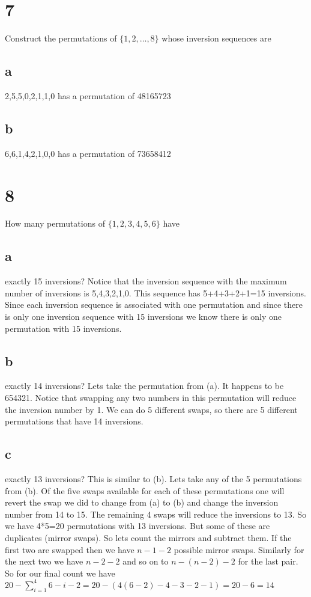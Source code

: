 \documentclass{article}
\begin{document}
\section*{7}
Construct the permutations of $\{1,2,\dots,8\}$ whose inversion sequences are
\subsection*{a}
2,5,5,0,2,1,1,0 has a permutation of 48165723
\subsection*{b}
6,6,1,4,2,1,0,0 has a permutation of 73658412
\section*{8}
How many permutations of $\{1,2,3,4,5,6\}$ have
\subsection*{a}
exactly 15 inversions? Notice that the inversion sequence with the maximum number of inversions is 5,4,3,2,1,0. This sequence has 5+4+3+2+1=15 inversions. Since each inversion sequence is associated with one permutation and since there is only one inversion sequence with 15 inversions we know there is only one permutation with 15 inversions.
\subsection*{b}
exactly 14 inversions? Lets take the permutation from (a). It happens to be 654321. Notice that swapping any two numbers in this permutation will reduce the inversion number by 1. We can do 5 different swaps, so there are 5 different permutations that have 14 inversions.
\subsection*{c}
exactly 13 inversions? This is similar to (b). Lets take any of the 5 permutations from (b). Of the five swaps available for each of these permutations one will revert the swap we did to change from (a) to (b) and change the inversion number from 14 to 15. The remaining 4 swaps will reduce the inversions to 13. So we have 4*5=20 permutations with 13 inversions. But some of these are duplicates (mirror swaps). So lets count the mirrors and subtract them. If the first two are swapped then we have $n-1-2$ possible mirror swaps. Similarly for the next two we have $n-2-2$ and so on to $n-(n-2)-2$ for the last pair. So for our final count we have $20-\sum\limits_{i=1}^4{6-i-2}=20-(4(6-2)-4-3-2-1)=20-6=14$
\end{document}
